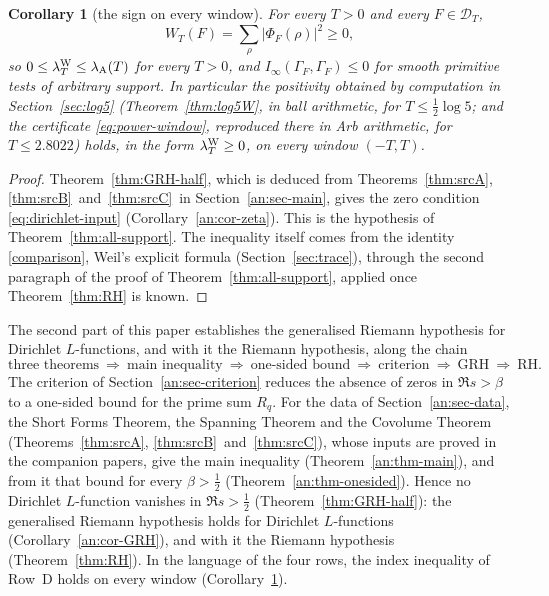 \documentclass[10pt]{amsart}
\newtheorem{corollary}[theorem]{Corollary}
\theoremstyle{definition}
\theoremstyle{remark}
\newcommand{\anThmA}{\ref{thm:srcA}}\newcommand{\anThmB}{\ref{thm:srcB}}\newcommand{\anThmC}{\ref{thm:srcC}}
\begin{document}
\begin{corollary}[the sign on every window]\label{cor:all-windows}
For every $T>0$ and every
$F\in\mathcal D_T$,
\[
 W_T(F)=\sum_\rho|\Phi_F(\rho)|^2\ge0 ,
\]
so $0\le\lambda^{\rm W}_T\le\lambda_{\rm A}(T)$ for every $T>0$, and
$I_\infty(\Gamma_F,\Gamma_F)\le0$ for smooth primitive tests of arbitrary
support. In particular the positivity obtained by computation in
Section~\ref{sec:log5} (Theorem~\ref{thm:log5W}, in ball arithmetic, for
$T\le\frac12\log5$; and the certificate \eqref{eq:power-window}, reproduced
there in Arb arithmetic, for $T\le2.8022$) holds, in the form
$\lambda^{\rm W}_T\ge0$, on every window $(-T,T)$.
\end{corollary}
\begin{proof}
Theorem~\ref{thm:GRH-half}, which is deduced from Theorems~\anThmA,
\anThmB\ and~\anThmC\ in Section~\ref{an:sec-main}, gives the zero condition
\eqref{eq:dirichlet-input} (Corollary~\ref{an:cor-zeta}). This is the
hypothesis of Theorem~\ref{thm:all-support}. The inequality itself comes
from the identity \eqref{comparison}, Weil's explicit formula
\cite{Weil52,Bombieri2000} (Section~\ref{sec:trace}), through the second paragraph of the proof of
Theorem~\ref{thm:all-support}, applied once Theorem~\ref{thm:RH} is known.
\end{proof}

\medskip
The second part of this paper establishes the generalised Riemann hypothesis
for Dirichlet $L$-functions, and with it the Riemann hypothesis, along the chain
\[
\text{three theorems}\ \Longrightarrow\ \text{main inequality}\ \Longrightarrow\
\text{one-sided bound}\ \Longrightarrow\ \text{criterion}\ \Longrightarrow\
\text{GRH}\ \Longrightarrow\ \text{RH}.
\]
The
criterion of Section~\ref{an:sec-criterion} reduces the absence of zeros in
$\Re s>\beta$ to a one-sided bound for the prime sum $R_q$. For the data of
Section~\ref{an:sec-data}, the Short Forms Theorem, the Spanning Theorem and
the Covolume Theorem (Theorems~\anThmA, \anThmB\ and~\anThmC), whose inputs
are proved in the companion papers, give the main inequality
(Theorem~\ref{an:thm-main}), and from it that bound for every
$\beta>\frac12$ (Theorem~\ref{an:thm-onesided}). Hence no Dirichlet
$L$-function vanishes in $\Re s>\frac12$ (Theorem~\ref{thm:GRH-half}): the
generalised Riemann hypothesis holds for Dirichlet $L$-functions
(Corollary~\ref{an:cor-GRH}), and with it the Riemann hypothesis
(Theorem~\ref{thm:RH}). In the language of the four rows, the index
inequality of Row~D holds on every window (Corollary~\ref{cor:all-windows}).
\end{document}
